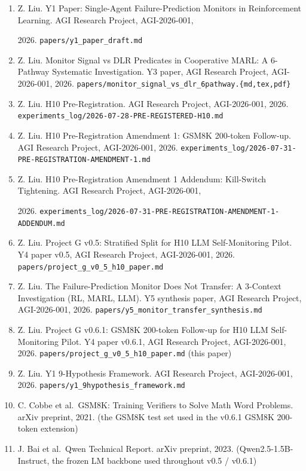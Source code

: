 \documentclass[
]{article}
\providecommand{\tightlist}{%
  \setlength{\itemsep}{0pt}\setlength{\parskip}{0pt}}
\begin{document}
\begin{enumerate}
\def\labelenumi{\arabic{enumi}.}
\tightlist
\item
  Z. Liu. Y1 Paper: Single-Agent Failure-Prediction Monitors in
  Reinforcement Learning. AGI Research Project, AGI-2026-001,

  2026. \texttt{papers/y1\_paper\_draft.md}
\item
  Z. Liu. Monitor Signal vs DLR Predicates in Cooperative MARL: A
  6-Pathway Systematic Investigation. Y3 paper, AGI Research Project,
  AGI-2026-001, 2026.
  \texttt{papers/monitor\_signal\_vs\_dlr\_6pathway.\{md,tex,pdf\}}
\item
  Z. Liu. H10 Pre-Registration. AGI Research Project, AGI-2026-001,
  2026. \texttt{experiments\_log/2026-07-28-PRE-REGISTERED-H10.md}
\item
  Z. Liu. H10 Pre-Registration Amendment 1: GSM8K 200-token Follow-up.
  AGI Research Project, AGI-2026-001, 2026.
  \texttt{experiments\_log/2026-07-31-PRE-REGISTRATION-AMENDMENT-1.md}
\item
  Z. Liu. H10 Pre-Registration Amendment 1 Addendum: Kill-Switch
  Tightening. AGI Research Project, AGI-2026-001,

  2026.
  \texttt{experiments\_log/2026-07-31-PRE-REGISTRATION-AMENDMENT-1-ADDENDUM.md}
\item
  Z. Liu. Project G v0.5: Stratified Split for H10 LLM Self-Monitoring
  Pilot. Y4 paper v0.5, AGI Research Project, AGI-2026-001, 2026.
  \texttt{papers/project\_g\_v0\_5\_h10\_paper.md}
\item
  Z. Liu. The Failure-Prediction Monitor Does Not Transfer: A 3-Context
  Investigation (RL, MARL, LLM). Y5 synthesis paper, AGI Research
  Project, AGI-2026-001, 2026.
  \texttt{papers/y5\_monitor\_transfer\_synthesis.md}
\item
  Z. Liu. Project G v0.6.1: GSM8K 200-token Follow-up for H10 LLM
  Self-Monitoring Pilot. Y4 paper v0.6.1, AGI Research Project,
  AGI-2026-001, 2026. \texttt{papers/project\_g\_v0\_5\_h10\_paper.md}
  (this paper)
\item
  Z. Liu. Y1 9-Hypothesis Framework. AGI Research Project, AGI-2026-001,
  2026. \texttt{papers/y1\_9hypothesis\_framework.md}
\item
  C. Cobbe et al.~GSM8K: Training Verifiers to Solve Math Word Problems.
  arXiv preprint, 2021. (the GSM8K test set used in the v0.6.1 GSM8K
  200-token extension)
\item
  J. Bai et al.~Qwen Technical Report. arXiv preprint, 2023.
  (Qwen2.5-1.5B-Instruct, the frozen LM backbone used throughout v0.5 /
  v0.6.1)
\end{enumerate}
\end{document}
